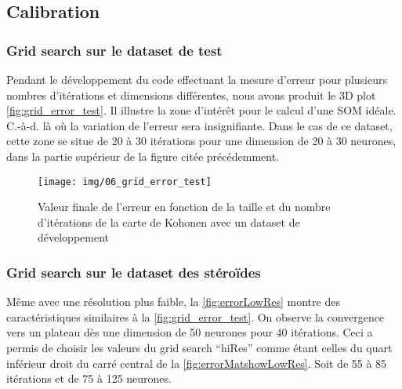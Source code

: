 

\subsection{Calibration}

\subsubsection*{Grid search sur le dataset de test}

    Pendant le développement du code effectuant la mesure d'erreur pour plusieurs nombres d'itérations et dimensions différentes, nous avons produit le 3D plot \autoref{fig:grid_error_test}. Il illustre la zone d'intérêt pour le calcul d'une SOM idéale. C.-à-d. là où la variation de l'erreur sera insignifiante. Dans le cas de ce dataset, cette zone se situe de 20 à 30 itérations pour une dimension de 20 à 30 neurones, dans la partie supérieur de la figure citée précédemment.

    \begin{figure}[H]
        \centering
        \texttt{[image: img/06\_grid\_error\_test]}    
        \caption{Valeur finale de l'erreur en fonction de la taille et du nombre d'itérations de la carte de Kohonen avec un dataset de développement}
        \label{fig:grid_error_test}
    \end{figure}


\subsubsection*{Grid search sur le dataset des stéroïdes}
    
    Même avec une résolution plus faible, la \autoref{fig:errorLowRes} montre des caractéristiques similaires à la \autoref{fig:grid_error_test}. On observe la convergence vers un plateau dès une dimension de 50 neurones pour 40 itérations. Ceci a permis de choisir les valeurs du grid search ``hiRes'' comme étant celles du quart inférieur droit du carré central de la \autoref{fig:errorMatshowLowRes}. Soit de 55 à 85 itérations et de 75 à 125 neurones.


